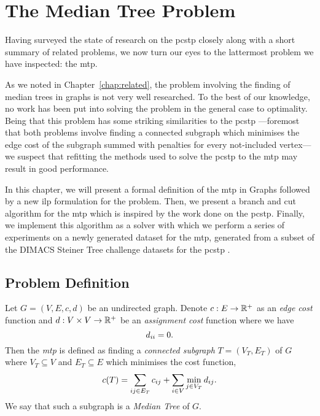 \chapter{The Median Tree Problem}\label{chap:mediantree}
Having surveyed the state of research on the \gls{pcstp} closely along with a
short summary of related problems, we now turn our eyes to the lattermost problem
we have inspected: the \gls{mtp}.

As we noted in Chapter~\ref{chap:related},
the problem involving the finding of median trees
in graphs is not very well researched. To the best of our knowledge, no work has been put into solving
the problem in the general case to optimality.
Being that this problem has some striking similarities
to the \gls{pcstp} ---foremost that both problems involve finding a connected
subgraph which minimises the edge cost of the subgraph summed with
penalties for every not-included vertex--- we suspect that refitting the
methods used to solve the \gls{pcstp} to the \gls{mtp} may result in good performance.

In this chapter, we will present a formal definition of the \acrlong{mtp} in Graphs
followed by a new \gls{ilp} formulation for the problem.
Then, we present a branch and cut algorithm for the \gls{mtp} which is inspired by the
work done on the \gls{pcstp}. Finally, we implement this algorithm as a solver with which
we perform a series of experiments on a newly generated dataset
for the \gls{mtp}, generated from a subset
of the DIMACS Steiner Tree challenge datasets for the \gls{pcstp} \citep{DIMACS}.
 
\section{Problem Definition}

Let $G = (V, E, c, d)$ be an undirected graph. Denote $c : E \to \mathbb{R}^+$ as an \textit{edge cost} function
and $d : V \times V  \to \mathbb{R}^+$ be an \textit{assignment cost} function where we have
\[d_{ii} = 0 \mathnormal{.}\]
Then the \textit{\acrlong{mtp}}
is defined as finding a \textit{connected subgraph} $T = (V_T, E_T)$ of $G$
where $V_T \subseteq V$ and
$E_T \subseteq E$ which minimises the cost function,
\[c(T) = \sum_{ij \in E_T} c_{ij} + \sum_{i \in V} \min_{j \in V_T} d_{ij}\mathnormal{.}\]
We say that such a subgraph is a \textit{Median Tree} of $G$.

